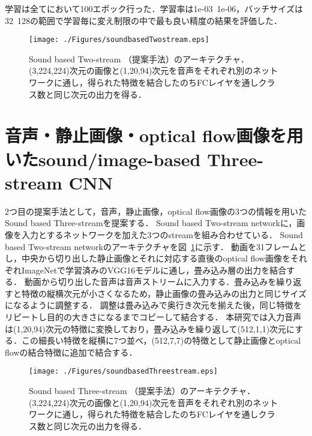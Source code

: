 学習は全てにおいて100エポック行った．学習率は1e-03~1e-06，バッチサイズは32~128の範囲で学習毎に変え制限の中で最も良い精度の結果を評価した．


\begin{figure}[htbp]
 \begin{center}
  \texttt{[image: ./Figures/soundbasedTwostream.eps]}
  \caption{Sound based Two-stream （提案手法）のアーキテクチャ．(3,224,224)次元の画像と(1,20,94)次元を音声をそれぞれ別のネットワークに通し，得られた特徴を結合したのちFCレイヤを通しクラス数と同じ次元の出力を得る．}
  \label{sound-two-stream}
 \end{center}
\end{figure}



\section{音声・静止画像・optical flow画像を用いたsound/image-based Three-stream CNN}
2つ目の提案手法として，音声，静止画像，optical flow画像の3つの情報を用いたSound based Three-streamを提案する．
Sound based Two-stream networkに，画像を入力とするネットワークを加えた3つのstreamを組み合わせている．
Sound based Two-stream networkのアーキテクチャを図~\ref{sound-two-stream}に示す．
動画を31フレームとし，中央から切り出した静止画像とそれに対応する直後のoptical flow画像をそれぞれImageNetで学習済みのVGG16モデルに通し，畳み込み層の出力を結合する．
動画から切り出した音声は音声ストリームに入力する．畳み込みを繰り返すと特徴の縦横次元が小さくなるため，静止画像の畳み込みの出力と同じサイズになるように調整する．
調整は畳み込みで奥行き次元を揃えた後，同じ特徴をリピートし目的の大きさになるまでコピーして結合する．
本研究では入力音声は(1,20,94)次元の特徴に変換しており，畳み込みを繰り返して(512,1,1)次元にする．この細長い特徴を縦横に7つ並べ，(512,7,7)の特徴として静止画像とoptical flowの結合特徴に追加で結合する．

\begin{figure}[htbp]
 \begin{center}
  \texttt{[image: ./Figures/soundbasedThreestream.eps]}
  \caption{Sound based Three-stream （提案手法）のアーキテクチャ．(3,224,224)次元の画像と(1,20,94)次元を音声をそれぞれ別のネットワークに通し，得られた特徴を結合したのちFCレイヤを通しクラス数と同じ次元の出力を得る．}
  \label{sound-three-stream}
 \end{center}
\end{figure}
